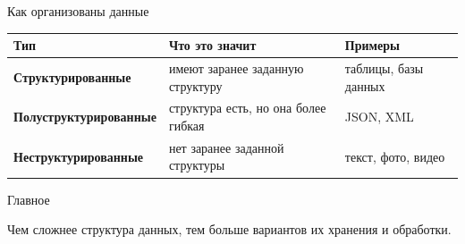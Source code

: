 \documentclass[aspectratio=169]{beamer}
\begin{document}
\begin{frame}{Как организованы данные}

\small

\begin{table}

\centering

\begin{tabular}{>{\bfseries}p{}|p{}|p{}}

\toprule

Тип & Что это значит & Примеры \\

\midrule

Структурированные &
имеют заранее заданную структуру &
таблицы, базы данных \\

Полуструктурированные &
структура есть, но она более гибкая &
JSON, XML \\

Неструктурированные &
нет заранее заданной структуры &
текст, фото, видео \\

\bottomrule

\end{tabular}

\end{table}

\vspace{0.4cm}

\begin{alertblock}{Главное}

Чем сложнее структура данных, тем больше вариантов их хранения и обработки.

\end{alertblock}

\end{frame}
\end{document}
